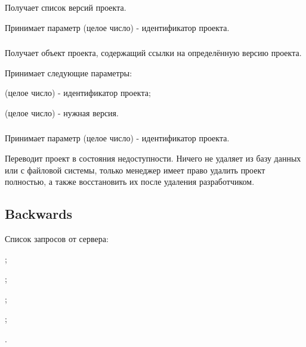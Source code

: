 \subsubsection{}

Получает список версий проекта.

Принимает параметр  (целое число) - идентификатор проекта.

\subsubsection{}

Получает объект проекта, содержащий ссылки на определённую версию проекта.

Принимает следующие параметры:

\begin{icItems}
	\item {} (целое число) - идентификатор проекта;
	\item {} (целое число) - нужная версия.
\end{icItems}

\subsubsection{}

Принимает параметр  (целое число) - идентификатор проекта.

Переводит проект в состояния недоступности. Ничего не удаляет из базу данных или с файловой системы, только менеджер имеет право удалить проект полностью, а также восстановить их после удаления разработчиком.

\subsection{Backwards}

Список запросов от сервера:
\begin{icItems}
	\item {};
	\item {};
	\item {};
	\item {};
	\item {}.
\end{icItems}

\subsubsection{}

